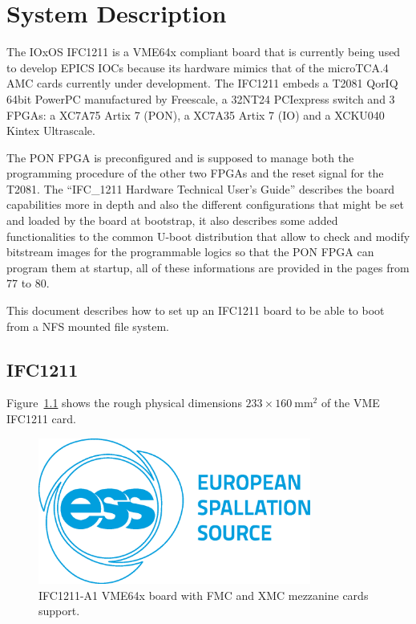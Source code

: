 \documentclass[11pt
  , a4paper
  , article
  , oneside
  , showtrims
]{memoir}
\begin{document}
\chapter{System Description}
The IOxOS IFC1211 is a VME64x compliant board that is currently being used to develop EPICS IOCs because its hardware mimics that of the microTCA.4 AMC cards currently under development.
The IFC1211 embeds a T2081 QorIQ 64bit PowerPC manufactured by Freescale, a 32NT24 PCIexpress switch and 3 FPGAs: a XC7A75 Artix 7 (PON), a XC7A35 Artix 7 (IO) and a XCKU040 Kintex Ultrascale.

The PON FPGA is preconfigured and is supposed to manage both the programming procedure of the other two FPGAs and the reset signal for the T2081.
The ``IFC\_1211 Hardware Technical User's Guide''\cite{IFC1211_HW_TUG} describes the board capabilities more in depth and also the different configurations that might be set and loaded by the board at bootstrap, it also describes some added functionalities to the common U-boot distribution that allow to check and modify bitstream images for the programmable logics so that the PON FPGA can program them at startup, all of these informations are provided in the pages from 77 to 80.

This document describes how to set up an IFC1211 board to be able to boot from a NFS mounted file system.

\section{IFC1211}
Figure~\ref{fig:ifc1211_dim} shows the rough physical dimensions $233\times 160~\mathrm{mm}{}^2$ of the VME IFC1211 card.

\begin{figure}[!htb]
  \centering
  \includegraphics[width=0.80\textwidth]{./figs/ESS_Logo_Frugal_Blue_cmyk.eps}
  \caption{
    IFC1211-A1 VME64x board with FMC and XMC mezzanine cards support.
  }
  \label{fig:ifc1211_dim}   
\end{figure}
\end{document}
